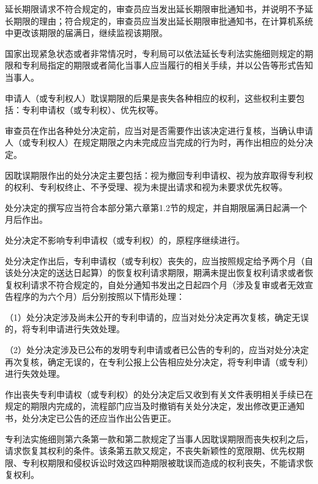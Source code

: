 延长期限请求不符合规定的，审查员应当发出延长期限审批通知书，并说明不予延长期限的理由；符合规定的，审查员应当发出延长期限审批通知书，在计算机系统中更改该期限的届满日，继续监视该期限。

国家出现紧急状态或者非常情况时，专利局可以依法延长专利法实施细则规定的期限和专利局指定的期限或者简化当事人应当履行的相关手续，并以公告等形式告知当事人。

申请人（或专利权人）耽误期限的后果是丧失各种相应的权利，这些权利主要包括：专利申请权（或专利权）、优先权等。

审查员在作出各种处分决定前，应当对是否需要作出该决定进行复核，当确认申请人（或专利权人）在规定期限之内未完成应当完成的行为时，再作出相应的处分决定。

因耽误期限作出的处分决定主要包括：视为撤回专利申请权、视为放弃取得专利权的权利、专利权终止、不予受理、视为未提出请求和视为未要求优先权等。

处分决定的撰写应当符合本部分第六章第1.2节的规定，并自期限届满日起满一个月后作出。

处分决定不影响专利申请权（或专利权）的，原程序继续进行。

处分决定作出后，专利申请权（或专利权）丧失的，应当按照规定给予两个月（自该处分决定的送达日起算）的恢复权利请求期限，期满未提出恢复权利请求或者恢复权利请求不符合规定的，自处分通知书发出之日起四个月（涉及复审或者无效宣告程序的为六个月）后分别按照以下情形处理：

{\setlength{\parindent}{17.1bp}（1）处分决定涉及尚未公开的专利申请的，应当对处分决定再次复核，确定无误的，将专利申请进行失效处理。\par}

{\setlength{\parindent}{17.1bp}（2）处分决定涉及已公布的发明专利申请或者已公告的专利的，应当对处分决定再次复核，确定无误的，在专利公报上公告相应处分决定，将专利申请（或专利）进行失效处理。\par}

作出丧失专利申请权（或专利权）的处分决定后又收到有关文件表明相关手续已在规定的期限内完成的，流程部门应当及时撤销有关处分决定，发出修改更正通知书，处分决定已公告的还应当作出公告更正。

专利法实施细则第六条第一款和第二款规定了当事人因耽误期限而丧失权利之后，请求恢复其权利的条件。该条第五款又规定，不丧失新颖性的宽限期、优先权期限、专利权期限和侵权诉讼时效这四种期限被耽误而造成的权利丧失，不能请求恢复权利。


